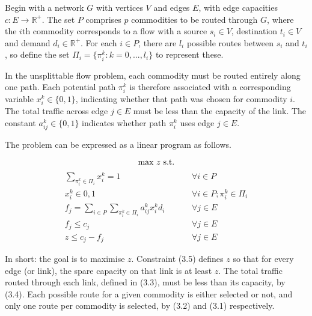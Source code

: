 Begin with a network $G$ with vertices $V$ and edges $E$, with edge capacities $c : E \rightarrow \mathbb{R}^+$. The set $P$ comprises $p$ commodities to be routed through $G$, where the $i$th commodity corresponds to a flow with a source $s_i \in V$, destination $t_i \in V$ and demand $d_i \in \mathbb{R}^+$. For each $i \in P$, there are $l_i$ possible routes between $s_i$ and $t_i$, so define the set $\Pi_i = \{\pi_i^k : k = 0, ..., l_i\}$ to represent these.

In the unsplittable flow problem, each commodity must be routed entirely along one path. Each potential path $\pi_i^k$ is therefore associated with a corresponding variable $x_i^k \in \{0,1\}$, indicating whether that path was chosen for commodity $i$. The total traffic across edge $j \in E$ must be less than the capacity of the link. The constant $a_{ij}^k \in \{0,1\}$ indicates whether path $\pi_i^k$ uses edge $j \in E$.

The problem can be expressed as a linear program as follows.

\begin{equation*}
	\text{max } z \text{ s.t.} \\
\end{equation*}
\begin{align}
	\sum_{\pi_i^k \in \Pi_i} x_i^k = 1 \hspace{1cm} &\forall i \in P \\
	x_i^k \in {0,1} \hspace{1cm} &\forall i \in P; \pi_i^k \in \Pi_i \\
	f_j = \sum_{i \in P} \sum_{\pi_i^k \in \Pi_i} a_{ij}^k x_i^k d_i \hspace{1cm} &\forall j \in E \\
	f_j \leq c_j \hspace{1cm} &\forall j \in E \\
	z \leq c_j - f_j \hspace{1cm} &\forall j \in E
\end{align}

In short: the goal is to maximise $z$. Constraint (3.5) defines $z$ so that for every edge (or link), the spare capacity on that link is at least $z$. The total traffic routed through each link, defined in (3.3), must be less than its capacity, by (3.4). Each possible route for a given commodity is either selected or not, and only one route per commodity is selected, by (3.2) and (3.1) respectively.
